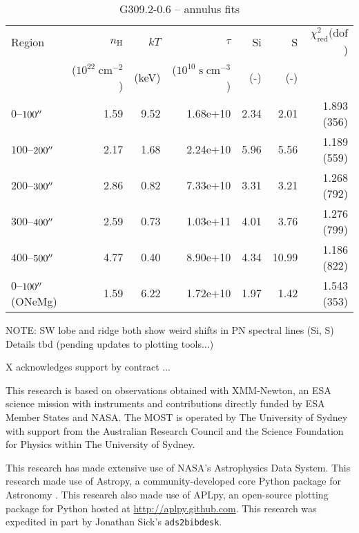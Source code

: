 \documentclass[preprint2,tighten,trackchanges]{aastex6}
\newcommand*{\mt}{\mathrm}
\newcommand*{\unit}[1]{\;\mt{#1}}  %
\begin{document}
\begin{table*}
    \centering
    \caption{G309.2-0.6 -- annulus fits}
    \begin{tabular}{@{}lrrrrrr@{}}
        \toprule
        Region & $n_\mathrm{H}$             & $kT$  & $\tau$                        & Si  & S   & $\chi^2_{\mathrm{red}} (\mathrm{dof}$) \\
               & ($10^{22} \unit{cm^{-2}}$) & (keV) & ($10^{10} \unit{s\;cm^{-3}}$) & (-) & (-) &  \\
        \midrule
        $0$--$100\mbox{$^{\prime\prime}$}$ & 1.59 & 9.52 & 1.68e+10 & 2.34 & 2.01 & 1.893 (356) \\  %
        $100$--$200\mbox{$^{\prime\prime}$}$ & 2.17 & 1.68 & 2.24e+10 & 5.96 & 5.56 & 1.189 (559) \\  %
        $200$--$300\mbox{$^{\prime\prime}$}$ & 2.86 & 0.82 & 7.33e+10 & 3.31 & 3.21 & 1.268 (792) \\  %
        $300$--$400\mbox{$^{\prime\prime}$}$ & 2.59 & 0.73 & 1.03e+11 & 4.01 & 3.76 & 1.276 (799) \\  %
        $400$--$500\mbox{$^{\prime\prime}$}$ & 4.77 & 0.40 & 8.90e+10 & 4.34 & 10.99 & 1.186 (822) \\  %
        \midrule
        $0$--$100\mbox{$^{\prime\prime}$}$ (ONeMg) & 1.59 & 6.22 & 1.72e+10 & 1.97 & 1.42 & 1.543 (353) \\  %
        \bottomrule
    \end{tabular}
\end{table*}


NOTE: SW lobe and ridge both show weird shifts in PN spectral lines (Si, S)
Details tbd (pending updates to plotting tools...)


\acknowledgments

X acknowledges support by contract ...

This research is based on observations obtained with XMM-Newton, an ESA science
mission with instruments and contributions directly funded by ESA Member States
and NASA.
The MOST is operated by The University of Sydney with support from the
Australian Research Council and the Science Foundation for Physics within The
University of Sydney.

This research has made extensive use of NASA's Astrophysics Data System.
This research made use of Astropy, a community-developed core Python package
for Astronomy \citep{astropy2013}.
This research also made use of APLpy, an open-source plotting package for
Python hosted at \href{http://aplpy.github.com}{http://aplpy.github.com}.
This research was expedited in part by Jonathan Sick's \texttt{ads2bibdesk}.
\end{document}
